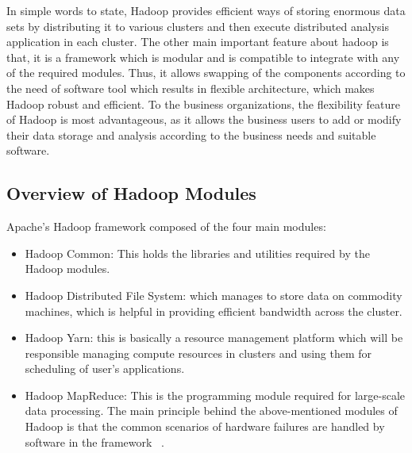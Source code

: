 In simple words to state, Hadoop provides efficient ways of storing enormous 
data sets by distributing it to various clusters and then execute distributed 
analysis application in each cluster. The other main important feature about 
hadoop is that, it is a framework which is modular and is compatible to 
integrate with any of the required modules. Thus, it allows swapping of the 
components according to the need of software tool which results in flexible 
architecture, which makes Hadoop robust and efficient. To the business 
organizations, the flexibility feature of Hadoop is most advantageous, as it 
allows the business users to add or modify their data storage and analysis  
according to the business needs and suitable software.


\subsection{Overview of Hadoop Modules}
Apache's Hadoop framework composed of the four main modules:

\begin{itemize}
\item Hadoop Common: This holds the libraries and utilities required by the 
Hadoop modules.
\item Hadoop Distributed File System: which manages to store data on commodity 
machines, which is helpful in providing efficient bandwidth across the cluster.
\item Hadoop Yarn: this is basically a resource management platform which will 
be responsible managing compute resources in clusters and using them for 
scheduling of user's applications.
\item Hadoop MapReduce: This is the programming module required for large-scale 
data processing.
The main principle behind the above-mentioned modules of Hadoop is that the 
common scenarios of  hardware failures are handled by software in the framework
~\cite{hid-sp18-406-hadoop-intro5}.
\end{itemize}


